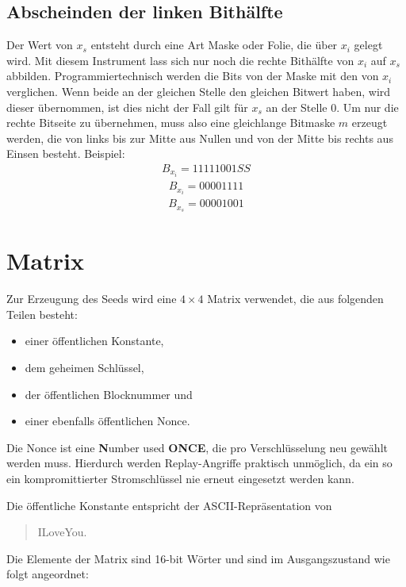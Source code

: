 \documentclass[10pt,a4paper]{article}
\begin{document}
\subsection{Abscheinden der linken Bithälfte}

Der Wert von $x_s$ entsteht durch eine Art Maske oder Folie, die über $x_i$ gelegt wird.
Mit diesem Instrument lass sich nur noch die rechte Bithälfte von $x_i$ auf $x_s$ abbilden.
Programmiertechnisch werden die Bits von der Maske mit den von $x_i$ verglichen.
Wenn beide an der gleichen Stelle den gleichen Bitwert haben, wird dieser übernommen, ist dies nicht der Fall gilt für $x_s$ an der Stelle 0.
Um nur die rechte Bitseite zu übernehmen, muss also eine gleichlange Bitmaske $m$ erzeugt werden, die von links bis zur Mitte aus Nullen und von der Mitte bis rechts aus Einsen besteht.
Beispiel:
\begin{align*}
    B_{x_i} = 1111 1001SS
\end{align*}
\begin{align*}
    B_{x_i} = 0000 1111
\end{align*}
\begin{align*}
    B_{x_s} = 0000 1001
\end{align*}

\section{Matrix}

Zur Erzeugung des Seeds wird eine $4 \times 4$ Matrix verwendet, die aus folgenden Teilen besteht:
\begin{itemize}
    \item einer öffentlichen Konstante,
    \item dem geheimen Schlüssel,
    \item der öffentlichen Blocknummer und
    \item einer ebenfalls öffentlichen Nonce.
\end{itemize}
Die Nonce ist eine \glqq \textbf{N}umber used \textbf{ONCE}\grqq{}, die pro Verschlüsselung neu gewählt werden muss.
Hierdurch werden Replay-Angriffe praktisch unmöglich, da ein so ein kompromittierter Stromschlüssel nie erneut eingesetzt werden kann.

Die öffentliche Konstante entspricht der ASCII-Repräsentation von
\begin{quotation}
    \glqq ILoveYou\grqq{}.
\end{quotation}

Die Elemente der Matrix sind 16-bit Wörter und sind im Ausgangszustand wie folgt angeordnet:
\end{document}
